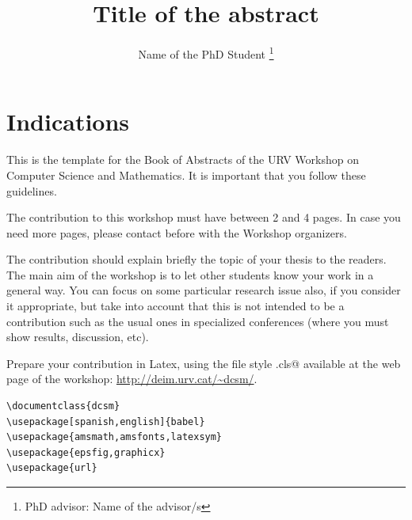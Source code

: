 \documentclass{dcsm}
\begin{document}

\title*{
 Title of the abstract
}
\author{
 Name of the PhD Student \thanks{PhD advisor: Name of the advisor/s}
}



\maketitle




\section{Indications}

This is the template for the Book of Abstracts of the URV Workshop on
Computer Science and Mathematics.
It is important that you follow these guidelines.

The contribution to this workshop must have between 2 and 4 pages.
In case you need more pages, please contact before with the Workshop organizers.

The contribution should explain briefly the topic of your thesis to the readers.
The main aim of the workshop is to let other students know your work in a general way.
You can focus on some particular research issue also, if you consider it appropriate,
but take into account that this is not intended to be a contribution such as the usual
ones in specialized conferences (where you must show results, discussion, etc).

Prepare your contribution in Latex, using the file style \verb@dcsm.cls@ 
available at the web page of the workshop:
\url{http://deim.urv.cat/~dcsm/}.

\begin{verbatim}
\documentclass{dcsm}
\usepackage[spanish,english]{babel}
\usepackage{amsmath,amsfonts,latexsym}
\usepackage{epsfig,graphicx}
\usepackage{url}
\end{verbatim}
\end{document}
